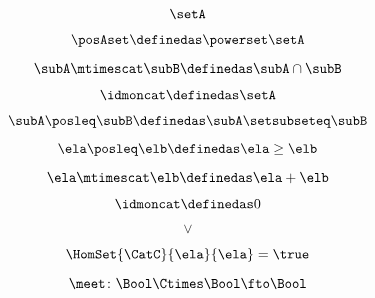 {\begin{forslides}
        \begin{equation}
            \label{eq:slides_enrichment_30}
            \setA
        \end{equation}

        \begin{equation}
            \label{eq:slides_enrichment_31}
            \posAset \definedas \powerset \setA
        \end{equation}

        \begin{equation}
            \label{eq:slides_enrichment_32}
            \subA \mtimescat \subB \definedas \subA \cap \subB
        \end{equation}

        \begin{equation}
            \label{eq:slides_enrichment_33}
            \idmoncat \definedas \setA
        \end{equation}

        \begin{equation}
            \label{eq:slides_enrichment_34}
            \subA \posleq \subB \definedas \subA \setsubseteq \subB
        \end{equation}

        \begin{equation}
            \label{eq:slides_enrichment_35}
            \ela \posleq \elb \definedas \ela \geq \elb
        \end{equation}

        \begin{equation}
            \label{eq:slides_enrichment_36}
            \ela \mtimescat \elb \definedas \ela + \elb
        \end{equation}

        \begin{equation}
            \label{eq:slides_enrichment_37}
            \idmoncat \definedas 0
        \end{equation}

        \begin{equation}
            \label{eq:slides_enrichment_38}
            \vee
        \end{equation}

        \begin{equation}
            \label{eq:slides_enrichment_39}
            \HomSet{\CatC}{\ela}{\ela} = \true
        \end{equation}

        \begin{equation}
            \label{eq:slides_enrichment_40}
            \meet \colon \Bool \Ctimes \Bool \fto \Bool
        \end{equation}


\end{forslides}}
